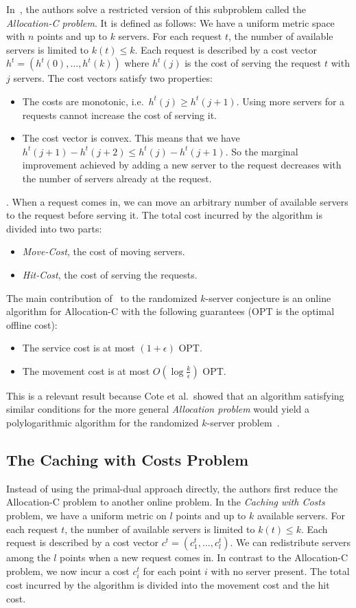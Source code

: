 In~\cite{bansal10:k-server}, the authors solve a restricted version of this subproblem called the \emph{Allocation-C problem}.
It is defined as follows:
We have a uniform metric space with $n$ points and up to $k$ servers.
For each request $t$, the number of available servers is limited to $k(t) \leq k$.
Each request is described by a cost vector $h^t = (h^t(0), \ldots, h^t(k))$ where $h^t(j)$ is the cost of serving the request $t$ with $j$ servers.
The cost vectors satisfy two properties:
\begin{itemize}
\item The costs are monotonic, i.e.\ $h^t(j) \geq h^t(j + 1)$.
Using more servers for a requests cannot increase the cost of serving it.
\item The cost vector is convex.
This means that we have $h^t(j+1) - h^t(j +2) \leq h^t(j) - h^t(j + 1)$.
So the marginal improvement achieved by adding a new server to the request decreases with the number of servers already at the request.
\end{itemize}.
When a request comes in, we can move an arbitrary number of available servers to the request before serving it.
The total cost incurred by the algorithm is divided into two parts:
\begin{itemize}
\item \emph{Move-Cost}, the cost of moving servers.
\item \emph{Hit-Cost}, the cost of serving the requests.
\end{itemize}

The main contribution of~\cite{bansal10:k-server} to the randomized $k$-server conjecture is an online algorithm for Allocation-C with the following guarantees (OPT is the optimal offline cost):
\begin{itemize}
\item The service cost is at most $(1+\epsilon)$ OPT.
\item The movement cost is at most $O(\log\frac{k}{\epsilon})$ OPT.
\end{itemize}
This is a relevant result because Cote et al.\ showed that an algorithm satisfying similar conditions for the more general \emph{Allocation problem} would yield a polylogarithmic algorithm for the randomized $k$-server problem~\cite{cote08:k-server}.


\subsection{The Caching with Costs Problem}
Instead of using the primal-dual approach directly, the authors first reduce the Allocation-C problem to another online problem.
In the \emph{Caching with Costs} problem, we have a uniform metric on $l$ points and up to $k$ available servers.
For each request $t$, the number of available servers is limited to $k(t) \leq k$.
Each request is described by a cost vector $c^t = (c_1^t, \ldots, c^t_l)$.
We can redistribute servers among the $l$ points when a new request comes in.
In contrast to the Allocation-C problem, we now incur a cost $c_i^t$ for each point $i$ with no server present.
The total cost incurred by the algorithm is divided into the movement cost and the hit cost.

